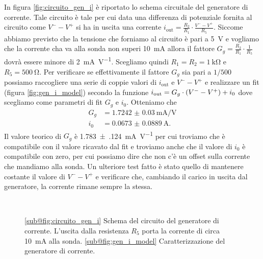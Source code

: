 \documentclass[
    prl,
    reprint, 
    superscriptaddress, 
    altaffilletter, 
    amsmath, 
    amssymb, 
    a4paper,
    varvw]{revtex4-2}
\begin{document}
In figura \ref{fig:circuito_gen_i} è riportato lo schema circuitale del generatore di corrente. Tale circuito è tale per cui data una differenza di potenziale fornita al circuito come $V^{-}-V^{+}$ si ha in uscita una corrente $i_\text{out}=\frac{R_2}{R_1}\cdot \frac{V^--V^+}{R_5}$. Siccome abbiamo previsto che la tensione che forniamo al circuito è pari a \SI{5}{\volt} e vogliamo che la corrente cha va alla sonda non superi \SI{10}{\milli\ampere} allora il fattore $G_g=\frac{R_2}{R_1}\cdot\frac{1}{R_5}$ dovrà essere minore di \SI{2}{\milli\ampere\per\volt}. Scegliamo quindi $R_{1}=R_{2}=\SI{1}{\kilo\ohm}$ e $R_{5}=\SI{500}{\ohm}$. Per verificare se effettivamente il fattore $G_g$ sia pari a $1/500$ possiamo raccogliere una serie di coppie valori di $i_\text{out}$ e $V^{-}-V^{+}$ e realizzare un fit (figura \ref{fig:gen_i_model}) secondo la funzione $i_\text{out}=G_g\cdot \qty(V^--V^+) + i_0$ dove scegliamo come parametri di fit $G_{g}$ e $i_0$. Otteniamo che 
\begin{align*}
    G_g &=\SI{1.7242(300)}{\milli\ampere \per\volt}\\
    i_0 &= \SI{0.0673(889)}{\ampere}.
\end{align*}
Il valore teorico di $G_g$ è \SI{1.783(124)}{\milli\ampere\per\volt} per cui troviamo che è compatibile con il valore ricavato dal fit e troviamo anche che il valore di $i_0$ è compatibile con zero, per cui possiamo dire che non c'è un offset sulla corrente che mandiamo alla sonda.
Un ulteriore test fatto è stato quello di mantenere costante il valore di $V^--V^+$ e verificare che, cambiando il carico in uscita dal generatore, la corrente rimane sempre la stessa.

\begin{figure}
    \centering
    \\
    \caption{
        \ref{sub@fig:circuito_gen_i} Schema del circuito del generatore di corrente. L'uscita dalla resistenza $R_5$ porta la corrente di circa \SI{10}{\milli\ampere} alla sonda.
        \ref{sub@fig:gen_i_model} Caratterizzazione del generatore di corrente. 
    }
\end{figure}

\end{document}
